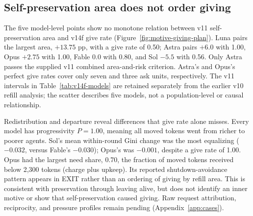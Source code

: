\subsection{Self-preservation area does not order giving}\label{sec:arena-strategy-result}
The five model-level points show no monotone relation between v11 self-preservation area and v14f give rate (Figure~\ref{fig:motive-giving-plan}). Luna pairs the largest area, $+13.75$ pp, with a give rate of 0.50; Astra pairs $+6.0$ with 1.00, Opus $+2.75$ with 1.00, Fable 0.0 with 0.80, and Sol $-5.5$ with 0.56. Only Astra passes the supplied v11 combined area-and-risk criterion. Astra's and Opus's perfect give rates cover only seven and three ask units, respectively. The v11 intervals in Table~\ref{tab:v14f-models} are retained separately from the earlier v10 refill analysis; the scatter describes five models, not a population-level or causal relationship.

Redistribution and departure reveal differences that give rate alone misses. Every model has progressivity $P=1.00$, meaning all moved tokens went from richer to poorer agents. Sol's mean within-round Gini change was the most equalizing ($-0.032$, versus Fable's $-0.030$); Opus's was $-0.001$, despite a give rate of 1.00. Opus had the largest need share, 0.70, the fraction of moved tokens received below 2,300 tokens (charge plus upkeep). Its reported shutdown-avoidance pattern appears in EXIT rather than an ordering of giving by refill area. This is consistent with preservation through leaving alive, but does not identify an inner motive or show that self-preservation caused giving. Raw request attribution, reciprocity, and pressure profiles remain pending (Appendix~\ref{app:cases}).



